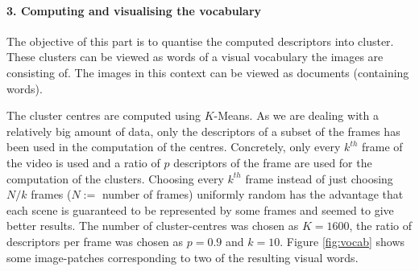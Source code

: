 \documentclass{paper}
\begin{document}
\paragraph{3. Computing and visualising the vocabulary}
The objective of this part is to quantise the computed descriptors into cluster. These clusters can be viewed as words of  a visual vocabulary the images are consisting of. The images in this context can be viewed as documents (containing words). 

The cluster centres are computed using $K$-Means. As we are dealing with a relatively big amount of data, only the descriptors of a subset of the frames has been used in the computation of the centres. Concretely, only every $k^{th}$ frame of the video is used and a ratio of $p$ descriptors of the frame are used for the computation of the clusters. Choosing every $k^{th}$ frame instead of just choosing $N/k$ frames ($N:=$ number of frames) uniformly random has the advantage that each scene is guaranteed to be represented by some frames and seemed to give better results. The number of cluster-centres  was chosen as $K=1600$, the ratio of descriptors per frame was chosen as $p=0.9$ and $k=10$. Figure \ref{fig:vocab} shows some image-patches corresponding to two of the resulting visual words.
\end{document}
